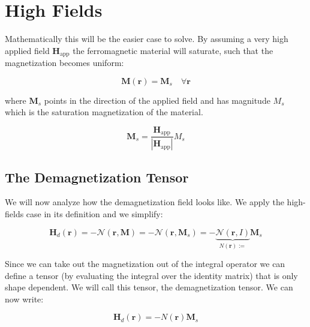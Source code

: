 


\section{High Fields}

Mathematically this will be the easier case to solve. By assuming a very high applied field $\textbf{H}_\text{app}$ the ferromagnetic material will saturate, such that the magnetization becomes uniform:

\begin{equation}
\textbf{M}(\textbf{r}) = \textbf{M}_s \quad \forall \textbf{r}
\end{equation}

where $\textbf{M}_s$ points in the direction of the applied field and has magnitude $M_s$ which is the saturation magnetization of the material.

\begin{equation}
\textbf{M}_s = \frac{\textbf{H}_\text{app}}{|\textbf{H}_\text{app}|}M_s 
\end{equation}

\subsection{The Demagnetization Tensor}

We will now analyze how the demagnetization field looks like. We apply the high-fields case in its definition and we simplify:

\begin{equation}
\textbf{H}_d(\textbf{r}) = - \mathcal{N}(\textbf{r},\textbf{M}) = - \mathcal{N}(\textbf{r},\textbf{M}_s) = - \underbrace{\mathcal{N}(\textbf{r},I)}_{N(\textbf{r}):=}\textbf{M}_s
\end{equation}

Since we can take out the magnetization out of the integral operator we can define a tensor (by evaluating the integral over the identity matrix) that is only shape dependent. We will call this tensor, the demagnetization tensor. We can now write:


\begin{equation}
\textbf{H}_d(\textbf{r}) = -N(\textbf{r})\textbf{M}_s
\end{equation}

